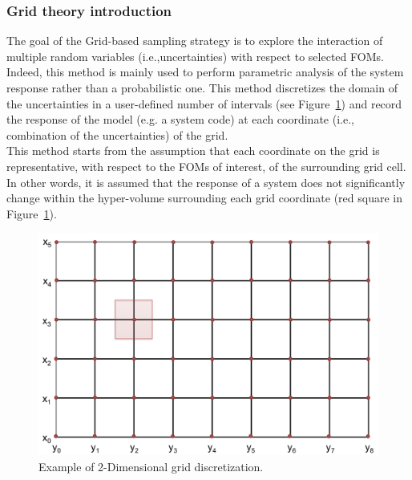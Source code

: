 \subsubsection{Grid theory introduction}
\label{subsub:Gridtheory}
The goal of the Grid-based sampling strategy is to explore the interaction of multiple random 
variables (i.e.,uncertainties) with respect to selected FOMs. Indeed, this method is mainly used to perform 
parametric analysis of the system response rather than a probabilistic one. This method discretizes the
domain of the uncertainties in a user-defined number of intervals (see Figure~\ref{fig:GridDiscretization}) and 
record the response of the model (e.g. a system code) at each coordinate (i.e., combination of the uncertainties) of the grid.
\\ This method starts from the assumption that each coordinate on the grid is representative, with respect to the FOMs of interest, of the surrounding grid cell. In other words, it is assumed that the response of a system does not significantly change within the hyper-volume surrounding each grid coordinate (red square in Figure~\ref{fig:GridDiscretization}).
 \begin{figure}[h!]
  \centering
  \includegraphics[scale=0.7]{pics/GridDiscretization.png}
  \caption{Example of 2-Dimensional grid discretization. }
  \label{fig:GridDiscretization}
 \end{figure}

